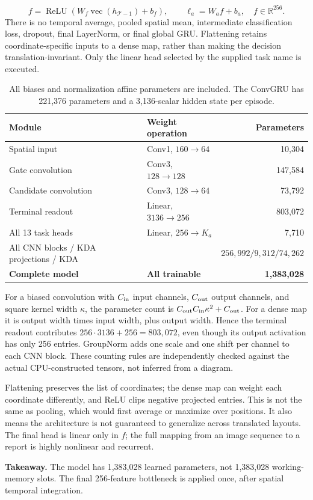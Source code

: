 \documentclass[10pt,letterpaper]{article}
\newcommand{\R}{\mathbb{R}}
\newcommand{\takeaway}[1]{\par\smallskip\noindent\textbf{Takeaway.} #1}
\begin{document}
\begin{equation}
f=\operatorname{ReLU}(W_f\operatorname{vec}(h_{\mathcal T-1})+b_f),\qquad
\ell_a=W_af+b_a,\quad f\in\R^{256}.\label{eq:head}
\end{equation}
There is no temporal average, pooled spatial mean, intermediate classification loss, dropout, final LayerNorm, or final global GRU. Flattening retains coordinate-specific inputs to a dense map, rather than making the decision translation-invariant. Only the linear head selected by the supplied task name is executed.
\begin{table}[h!]
\centering\small
\begin{tabular}{@{}llr@{}}\toprule
Module & Weight operation & Parameters\\\midrule
Spatial input & Conv1, $160\to64$ & 10,304\\
Gate convolution & Conv3, $128\to128$ & 147,584\\
Candidate convolution & Conv3, $128\to64$ & 73,792\\
Terminal readout & Linear, $3136\to256$ & 803,072\\
All 13 task heads & Linear, $256\to K_a$ & 7,710\\\midrule
All CNN blocks / KDA projections / KDA & & $256,992/9,312/74,262$\\
\textbf{Complete model} & \textbf{All trainable} & \textbf{1,383,028}\\\bottomrule
\end{tabular}
\caption{All biases and normalization affine parameters are included. The ConvGRU has 221,376 parameters and a 3,136-scalar hidden state per episode.}
\end{table}

For a biased convolution with $C_{\rm in}$ input channels, $C_{\rm out}$ output channels, and square kernel width $\kappa$, the parameter count is $C_{\rm out}C_{\rm in}\kappa^2+C_{\rm out}$. For a dense map it is output width times input width, plus output width. Hence the terminal readout contributes $256\cdot3136+256=803{,}072$, even though its output activation has only 256 entries. GroupNorm adds one scale and one shift per channel to each CNN block. These counting rules are independently checked against the actual CPU-constructed tensors, not inferred from a diagram.

Flattening preserves the list of coordinates; the dense map can weight each coordinate differently, and ReLU clips negative projected entries. This is not the same as pooling, which would first average or maximize over positions. It also means the architecture is not guaranteed to generalize across translated layouts. The final head is linear only in $f$; the full mapping from an image sequence to a report is highly nonlinear and recurrent.
\takeaway{The model has 1,383,028 learned parameters, not 1,383,028 working-memory slots. The final 256-feature bottleneck is applied once, after spatial temporal integration.}
\end{document}
